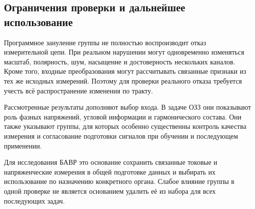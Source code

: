 \subsection{Ограничения проверки и дальнейшее использование}
\label{sec:ch4_input_sensitivity_meaning}


Программное зануление группы не полностью воспроизводит
отказ измерительной цепи. При реальном нарушении
могут одновременно изменяться масштаб, полярность,
шум, насыщение и достоверность нескольких каналов.
Кроме того, входные преобразования могут рассчитывать
связанные признаки из тех же исходных измерений.
Поэтому для проверки реального отказа требуется
учесть всё распространение изменения по тракту.

Рассмотренные результаты дополняют выбор входа.
В задаче ОЗЗ они показывают роль фазных напряжений,
угловой информации и гармонического состава.
Они также указывают группы, для которых особенно
существенны контроль качества измерения
и согласование подготовки сигналов при обучении
и последующем применении.

Для исследования БАВР это основание сохранить
связанные токовые и напряженческие измерения
в общей подготовке данных и выбирать их использование
по назначению конкретного органа.
Слабое влияние группы в одной проверке
не является основанием удалить её из набора
для всех последующих задач.
